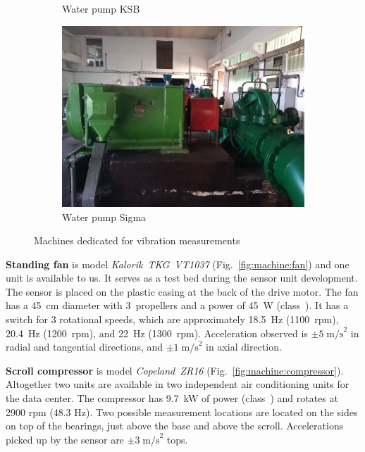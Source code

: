 \begin{figure}[ht]
\begin{subfigure}[b]{0.31\textwidth}
        \caption{\footnotesize Water pump KSB}
        \label{fig:machine:pump-ksb}
    \end{subfigure}
    \hfill
    \begin{subfigure}[b]{0.31\textwidth}
    		\centering
        \includegraphics[width=\textwidth]{assets/design/machine-sigma-pump.jpg}
        \caption{\footnotesize Water pump Sigma}
        \label{fig:machine:pump-sigma}
    \end{subfigure}
    \caption{Machines dedicated for vibration measurements}
\end{figure}

\textbf{Standing fan} is model \emph{Kalorik~TKG~VT1037} (Fig.~\ref{fig:machine:fan}) and one unit is available to us. It serves as a test bed during the sensor unit development. The sensor is placed on the plastic casing at the back of the drive motor. The fan has a 45~cm diameter with 3~propellers and a power of 45~W (class~). It has a switch for 3 rotational speeds, which are approximately 18.5~Hz (1100~rpm), 20.4~Hz (1200~rpm), and 22~Hz (1300~rpm). Acceleration observed is $\pm 5\;\mathrm{m/s}^2$ in radial and tangential directions, and $\pm 1\;\mathrm{m/s}^2$ in axial direction.

\textbf{Scroll compressor} is model \emph{Copeland~ZR16} (Fig.~\ref{fig:machine:compressor}). Altogether two units are available in two independent air conditioning units for the data center. The compressor has 9.7~kW of power (class~) and rotates at 2900 rpm (48.3 Hz). Two possible measurement locations are located on the sides on top of the bearings, just above the base and above the scroll. Accelerations picked up by the sensor are $\pm 3\;\mathrm{m/s}^2$ tops.

